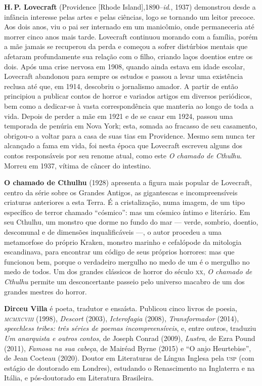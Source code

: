 \textbf{H.\,P. Lovecraft} (Providence [Rhode Island],1890--\emph{id}., 1937) demonstrou desde a infância interesse pelas artes e
pelas ciências, logo se tornando um leitor precoce. Aos dois anos, viu o pai ser internado em um manicômio, onde permaneceria até
morrer cinco anos mais tarde. Lovecraft continuou morando com a família,
porém a mãe jamais se recuperou da perda e começou a sofrer 
distúrbios mentais que afetaram profundamente sua relação com o filho,
criando laços doentios entre os dois. Após uma crise nervosa em 1908,
quando ainda estava em idade escolar, Lovecraft abandonou para sempre os
estudos e passou a levar uma existência reclusa até que, em 1914,
descobriu o jornalismo amador. A partir de então principiou a publicar
contos de horror e variados artigos em diversos periódicos, bem como a dedicar-se à vasta
correspondência que manteria ao longo de toda a vida.
Depois de perder a mãe em 1921 e de se casar em 1924, passou uma temporada
de penúria em Nova York; esta, somada ao fracasso de seu casamento,
obrigou-o a voltar para a casa de suas tias em Providence.
Mesmo sem nunca ter alcançado a fama em vida, foi nesta época que
Lovecraft escreveu alguns dos contos responsáveis por seu renome atual,
como este \emph{O chamado de Cthulhu}.
Morreu em 1937, vítima de câncer do intestino.

\textbf{O chamado de Cthulhu} (1928) apresenta a figura mais popular de Lovecraft, centro da série sobre os Grandes Antigos, as gigantescas e incompreensíveis criaturas anteriores a esta Terra. É a cristalização, numa imagem, de um tipo específico de terror chamado ``cósmico'': mas um cósmico íntimo e literário. Em seu Cthulhu, um monstro que dorme no fundo do mar --- verde, sombrio, doentio, descomunal e de dimensões inqualificáveis ---, o autor procedeu a uma metamorfose do próprio Kraken, monstro marinho e cefalópode da mitologia escandinava, para encontrar um código de seus próprios horrores: mas que funcionou bem, porque o verdadeiro mergulho no medo de um é o mergulho no medo de todos. Um dos grandes clássicos de horror do século \textsc{xx}, \textit{O chamado de Cthulhu} permite um desconcertante passeio pelo universo macabro de um dos grandes mestres do horror.

 
\textbf{Dirceu Villa} é poeta, tradutor e ensaísta. Publicou cinco livros de poesia, \emph{\textsc{mcmxcviii}} (1998), \emph{Descort} (2003), \emph{Icterofagia} (2008), \emph{Transformador} (2014), \emph{speechless tribes: três séries de poemas incompreensíveis}, e, entre outros, traduziu \emph{Um anarquista e outros contos}, de Joseph Conrad (2009), \emph{Lustra}, de Ezra Pound (2011), \emph{Famosa na sua cabeça}, de Mairéad Byrne (2015) e ``O anjo Heurtebise'', de Jean Cocteau (2020). Doutor em Literaturas de Língua Inglesa pela \textsc{usp} (com estágio de doutorado em Londres), estudando o Renascimento na Inglaterra e na Itália, e pós-doutorado em Literatura Brasileira.


